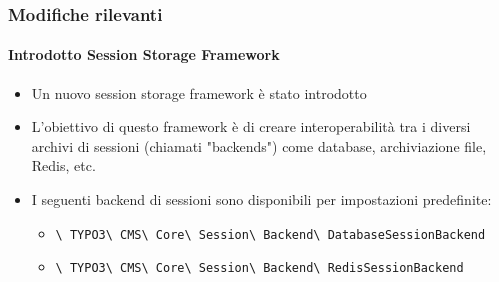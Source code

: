 
\begin{frame}[fragile]
	\frametitle{Modifiche rilevanti}
	\framesubtitle{Introdotto Session Storage Framework}

	\begin{itemize}
		\item Un nuovo session storage framework è stato introdotto
		\item L'obiettivo di questo framework è di creare interoperabilità tra i diversi archivi di sessioni
			(chiamati "backends") come database, archiviazione file, Redis, etc.
		\item I seguenti backend di sessioni sono disponibili per impostazioni predefinite:

			\begin{itemize}
				\item
					\smaller\texttt{\textbackslash
						TYPO3\textbackslash
						CMS\textbackslash
						Core\textbackslash
						Session\textbackslash
						Backend\textbackslash
						DatabaseSessionBackend}

				\item
					\texttt{\textbackslash
						TYPO3\textbackslash
						CMS\textbackslash
						Core\textbackslash
						Session\textbackslash
						Backend\textbackslash
						RedisSessionBackend}
			\end{itemize}
	\end{itemize}

\end{frame}


